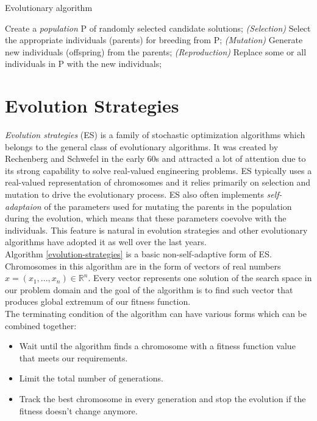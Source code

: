 \begin{algorithm}
	\caption{Evolutionary algorithm}\label{evolutionary-algorithm}
	\begin{algorithmic}[1]
		\State Create a \textit{population} P of randomly selected candidate solutions;
		    \State \textit{(Selection)} Select the appropriate individuals (parents) for breeding from P;
		    \State \textit{(Mutation)} Generate new individuals (offspring) from the parents;
		    \State \textit{(Reproduction)} Replace some or all individuals in P with the new individuals;
		\EndWhile
	\end{algorithmic}
\end{algorithm}

\section{Evolution Strategies}
\textit{Evolution strategies} (ES) is a family of stochastic optimization algorithms which belongs to the general class of evolutionary algorithms. It was created by Rechenberg and Schwefel in the early 60s and attracted a lot of attention due to its strong capability to solve real-valued engineering problems. ES typically uses a real-valued representation of chromosomes and it relies primarily on selection and mutation to drive the evolutionary process. ES also often implements \textit{self-adaptaion} of the parameters used for mutating the parents in the population during the evolution, which means that these parameters coevolve with the individuals. This feature is natural in evolution strategies and other evolutionary algorithms have adopted it as well over the last years.\\
Algorithm \ref{evolution-strategies} is a basic non-self-adaptive form of ES. Chromosomes in this algorithm are in the form of vectors of real numbers $x = (x_1,...,x_n) \in \mathbb{R}^n$. Every vector represents one solution of the search space in our problem domain and the goal of the algorithm is to find such vector that produces global extremum of our fitness function.\\
The terminating condition of the algorithm can have various forms which can be combined together:

 \begin{itemize}
    \item Wait until the algorithm finds a chromosome with a fitness function value that meets our requirements.
    \item Limit the total number of generations.
    \item Track the best chromosome in every generation and stop the evolution if the fitness doesn't change anymore.
 \end{itemize}

